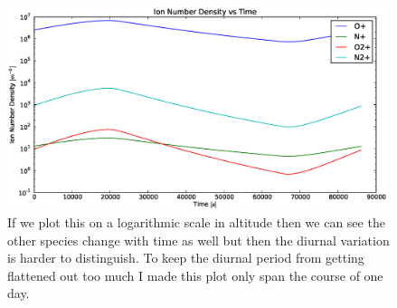 \documentclass[10pt]{article}
\begin{document}
\begin{figure}[H]
	\centering
		\includegraphics[width=0.99\textwidth]{./noon/B/Ion_Number_Density_vs_time_log.eps}
	\caption{If we plot this on a logarithmic scale in altitude then we can see the other species change with time as well but then the diurnal variation is harder to distinguish. To keep the diurnal period from getting flattened out too much I made this plot only span the course of one day.}
	\label{fig:nvt1}
\end{figure}
\end{document}

